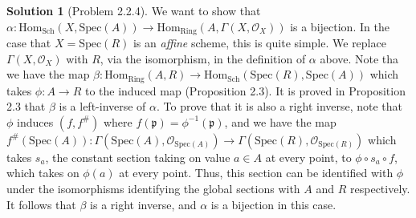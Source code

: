 \documentclass[aps,pra,showpacs,notitlepage,onecolumn,superscriptaddress,nofootinbib]{revtex4-1}
\theoremstyle{definition}
\newtheorem{solution}{Solution}[section]
\begin{document}
\begin{solution}[Problem 2.2.4]
  We want to show that $\alpha : \text{Hom}_{\text{Sch}}(X, \text{Spec}(A)) \rightarrow \text{Hom}_{\text{Ring}}(A, \Gamma(X, \mathcal{O}_X))$ is a bijection. In the case that $X = \text{Spec}(R)$ is an \emph{affine} scheme,
  this is quite simple. We replace $\Gamma(X, \mathcal{O}_X)$ with $R$, via the isomorphism, in the definition of $\alpha$ above.
  Note tha we have the map $\beta : \text{Hom}_{\text{Ring}}(A, R) \rightarrow \text{Hom}_{\text{Sch}}(\text{Spec}(R), \text{Spec}(A))$ which takes $\phi : A \rightarrow R$ to the induced map (Proposition 2.3). It is proved in
  Proposition 2.3 that $\beta$ is a left-inverse of $\alpha$. To prove that it is also a right inverse, note that $\phi$ induces $(f, f^{\#})$ where $f(\mathfrak{p}) = \phi^{-1}(\mathfrak{p})$, and we have
  the map $f^{\#}(\text{Spec}(A)) : \Gamma(\text{Spec}(A), \mathcal{O}_{\text{Spec}(A)}) \rightarrow \Gamma(\text{Spec}(R), \mathcal{O}_{\text{Spec}(R)})$ which takes $s_a$, the constant
  section taking on value $a \in A$ at every point, to $\phi \circ s_a \circ f$, which takes on $\phi(a)$ at every point. Thus, this section can be identified with $\phi$ under the isomorphisms identifying the
  global sections with $A$ and $R$ respectively. It follows that $\beta$ is a right inverse, and $\alpha$ is a bijection in this case.


\end{solution}
\end{document}
